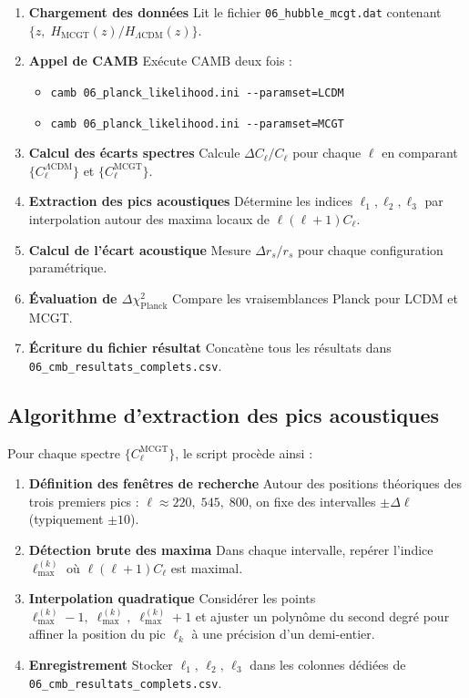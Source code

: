 \begin{enumerate}[label=\arabic*.]
  \item \textbf{Chargement des données}  
    Lit le fichier \texttt{06\_hubble\_mcgt.dat} contenant 
    \(\{z,\;H_{\mathrm{MCGT}}(z)/H_{\Lambda\mathrm{CDM}}(z)\}\).
  \item \textbf{Appel de CAMB}  
    Exécute CAMB deux fois :  
    \begin{itemize}
      \item \verb|camb 06_planck_likelihood.ini --paramset=LCDM|  
      \item \verb|camb 06_planck_likelihood.ini --paramset=MCGT|
    \end{itemize}
  \item \textbf{Calcul des écarts spectres}  
    Calcule \(\Delta C_{\ell}/C_{\ell}\) pour chaque \(\ell\) en comparant  
    \(\{C_{\ell}^{\Lambda\mathrm{CDM}}\}\) et \(\{C_{\ell}^{\mathrm{MCGT}}\}\).
  \item \textbf{Extraction des pics acoustiques}  
    Détermine les indices \(\ell_{1},\ell_{2},\ell_{3}\) par interpolation  
    autour des maxima locaux de \(\ell(\ell+1)C_{\ell}\).
  \item \textbf{Calcul de l’écart acoustique}  
    Mesure \(\Delta r_{s}/r_{s}\) pour chaque configuration paramétrique.
  \item \textbf{Évaluation de \(\Delta\chi^{2}_{\mathrm{Planck}}\)}  
    Compare les vraisemblances Planck pour LCDM et MCGT.
  \item \textbf{Écriture du fichier résultat}  
    Concatène tous les résultats dans  
    \texttt{06\_cmb\_resultats\_complets.csv}.
\end{enumerate}

\subsection{Algorithme d’extraction des pics acoustiques}

Pour chaque spectre \(\{C_{\ell}^{\mathrm{MCGT}}\}\), le script procède ainsi :

\begin{enumerate}[label=\arabic*.]
  \item \textbf{Définition des fenêtres de recherche}  
    Autour des positions théoriques des trois premiers pics :
    \(\ell \approx 220,\;545,\;800\), on fixe des intervalles \(\pm\Delta\ell\) (typiquement \(\pm10\)).
  \item \textbf{Détection brute des maxima}  
    Dans chaque intervalle, repérer l’indice \(\ell_{\max}^{(k)}\) où \(\ell(\ell+1)C_{\ell}\) est maximal.
  \item \textbf{Interpolation quadratique}  
    Considérer les points \(\ell_{\max}^{(k)} - 1,\;\ell_{\max}^{(k)},\;\ell_{\max}^{(k)} + 1\) et ajuster un polynôme du second degré pour affiner la position du pic \(\ell_{k}\) à une précision d’un demi-entier.
  \item \textbf{Enregistrement}  
    Stocker \(\ell_{1},\,\ell_{2},\,\ell_{3}\) dans les colonnes dédiées de \texttt{06\_cmb\_resultats\_complets.csv}.
\end{enumerate}

